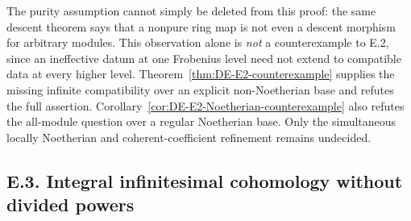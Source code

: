 The purity assumption cannot simply be deleted from this proof: the same descent theorem says that a nonpure ring map is not even a descent morphism for arbitrary modules.  This observation alone is \emph{not} a counterexample to E.2, since an ineffective datum at one Frobenius level need not extend to compatible data at every higher level.  Theorem~\ref{thm:DE-E2-counterexample} supplies the missing infinite compatibility over an explicit non-Noetherian base and refutes the full assertion.  Corollary~\ref{cor:DE-E2-Noetherian-counterexample} also refutes the all-module question over a regular Noetherian base.  Only the simultaneous locally Noetherian and coherent-coefficient refinement remains undecided.


\subsection{E.3. Integral infinitesimal cohomology without divided powers}

